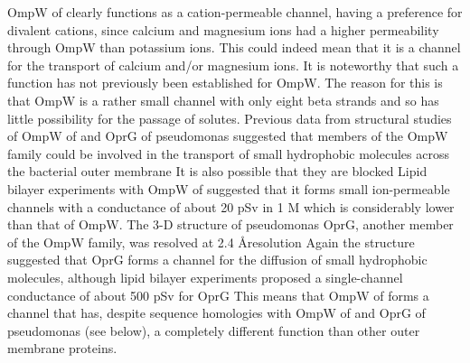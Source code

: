 OmpW of \caulobacter clearly functions as a cation-permeable channel, having a preference for divalent cations, since calcium and magnesium ions had a higher permeability through OmpW than potassium ions. This could indeed mean that it is a channel for the transport of calcium and/or magnesium ions. It is noteworthy that such a function has not previously been established for OmpW. The reason for this is that OmpW is a rather small channel with only eight beta strands and so has little possibility for the passage of solutes. Previous data from structural studies of OmpW of \ecoli and OprG of \ac{pseudomonas} suggested that members of the OmpW family could be involved in the transport of small hydrophobic molecules across the bacterial outer membrane It is also possible that they are blocked Lipid bilayer experiments with OmpW of \ecoli suggested that it forms small ion-permeable channels with a conductance of about 20 \si{\pico\sievert} in 1 M  which is considerably lower than that of \caulobacter OmpW. The 3-D structure of \ac{pseudomonas} OprG, another member of the OmpW family, was resolved at 2.4 \AA resolution Again the structure suggested that OprG forms a channel for the diffusion of small hydrophobic molecules, although lipid bilayer experiments proposed a single-channel conductance of about 500 \si{\pico\sievert} for OprG This means that OmpW of \caulobacter forms a channel that has, despite sequence homologies with OmpW of \ecoli and OprG of \ac{pseudomonas} (see below), a completely different function than other outer membrane proteins.

